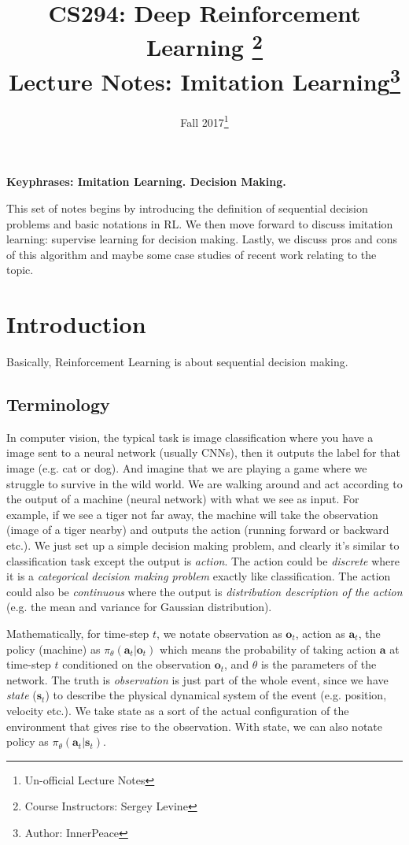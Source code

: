 \documentclass[nobib]{tufte-handout}
\title{CS294: Deep Reinforcement Learning
       \thanks{Course Instructors: Sergey Levine} \\
       \Large Lecture Notes: Imitation Learning\thanks{Author: InnerPeace}}
\date{Fall 2017\thanks{Un-official Lecture Notes}} %
\begin{document}
\maketitle%



\textbf{Keyphrases: Imitation Learning. Decision Making.}

This set of notes begins by introducing the definition of sequential decision problems and basic notations in RL. We then move forward to discuss imitation learning: supervise learning for decision making. Lastly, we discuss pros and cons of this algorithm and maybe some case studies of recent work relating to the topic.


\section{Introduction}\label{sec:intro-rl}

Basically, Reinforcement Learning is about sequential decision making.
\subsection{Terminology}
In computer vision, the typical task is image classification where you have a image sent to a neural network (usually CNNs), then it outputs the
label for that image (e.g. cat or dog). And imagine that we are playing a game where we struggle to survive in the wild world. We are walking around and act according to the output of a machine (neural network) with what we see as input. For example, if we see a tiger not far away, the machine will take the observation (image of a tiger nearby) and outputs the action (running forward or backward etc.). We just set up a simple decision making problem, and clearly it's similar to classification task except the output is \emph{action}. The action could be \emph{discrete} where it is a \emph{categorical decision making problem} exactly like classification. The action could also be \emph{continuous} where the output is \emph{distribution description of the action} (e.g. the mean and variance for Gaussian distribution).

Mathematically, for time-step $t$, we notate observation as $\mathbf{o}_t$, action as $\mathbf{a}_t$, the policy (machine) as $\pi_\theta(\mathbf{a}_t | \mathbf{o}_t) $ which means the probability of taking action $\mathbf{a}$ at time-step $t$ conditioned on the observation $\mathbf{o}_t$, and $\theta$ is the parameters of the network. The truth is \emph{observation} is just part of the whole event, since we have \emph{state} ($\mathbf{s}_t$) to describe the physical dynamical system of the event (e.g. position, velocity etc.). We take state as a sort of the actual configuration of the environment that gives rise to the observation. With state, we can also notate policy as $\pi_\theta(\mathbf{a}_t | \mathbf{s}_t) $.
\end{document}
